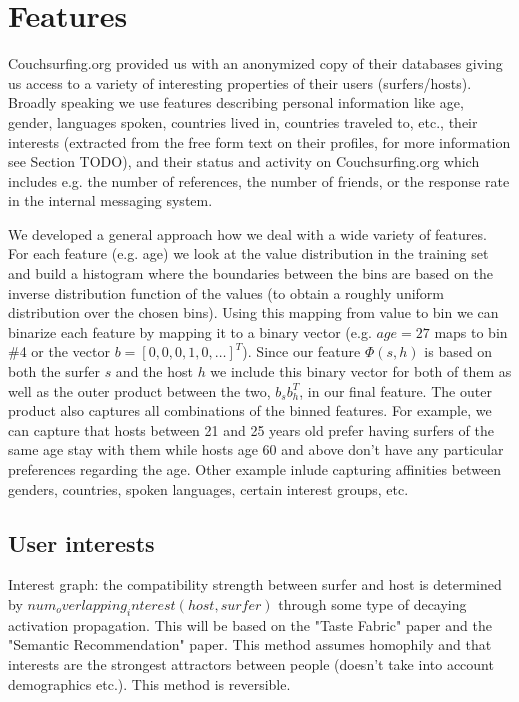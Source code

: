 \section{Features}

Couchsurfing.org provided us with an anonymized copy of their databases giving us access to a variety of interesting properties of their users (surfers/hosts). 
Broadly speaking we use features describing personal information like age, gender, languages spoken, countries lived in, countries traveled to, etc., their interests (extracted from the free form text on their profiles, for more information see Section TODO), and their status and activity on Couchsurfing.org which includes e.g. the number of references, the number of friends, or the response rate in the internal messaging system.

We developed a general approach how we deal with a wide variety of features. For each feature (e.g. age) we look at the value distribution in the training set and build a histogram where the boundaries between the bins are based on the inverse distribution function of the values (to obtain a roughly uniform distribution over the chosen bins). Using this mapping from value to bin we can binarize each feature by mapping it to a binary vector (e.g. $age=27$ maps to bin \#4 or the vector $b=[0,0,0,1,0,\dots]^T$). Since our feature $\Phi(s,h)$ is based on both the surfer $s$ and the host $h$ we include this binary vector for both of them as well as the outer product between the two, $b_s b_h^T$, in our final feature. The outer product also captures all combinations of the binned features. For example, we can capture that hosts between 21 and 25 years old prefer having surfers of the same age stay with them while hosts age 60 and above don't have any particular preferences regarding the age. Other example inlude capturing affinities between genders, countries, spoken languages, certain interest groups, etc.




\subsection{User interests}
Interest graph: the compatibility strength between surfer and host is determined by $num_overlapping_interest(host, surfer)$ through some type of decaying activation propagation.  This will be based on the "Taste Fabric" paper and the "Semantic Recommendation" paper.  This method assumes homophily and that interests are the strongest attractors between people (doesn't take into account demographics etc.).  This method is reversible.

